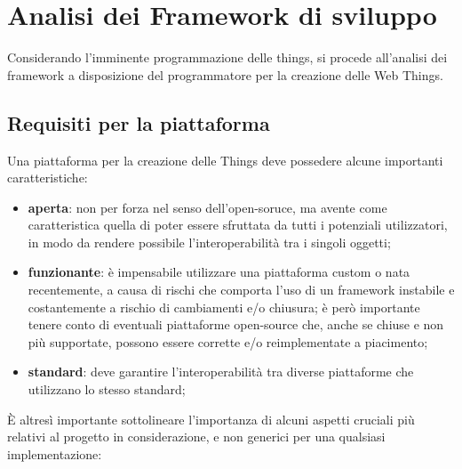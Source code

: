 \documentclass[12pt,a4paper,openright,oneside]{report}
\begin{document}
\clearpage{\pagestyle{empty}\cleardoublepage}
\chapter{Analisi dei Framework di sviluppo}           %
\lhead[\fancyplain{}{\bfseries\thepage}]{\fancyplain{}{\bfseries\rightmark}}  

Considerando l'imminente programmazione delle things, si procede all'analisi dei framework a disposizione del programmatore per la creazione delle Web Things.

\section{Requisiti per la piattaforma}
\label{sec:iot_platform}
Una piattaforma per la creazione delle Things deve possedere alcune importanti caratteristiche:

\begin{itemize}
	\setlength\itemsep{0em}
	\item \textbf{aperta}: non per forza nel senso dell'open-soruce, ma avente come caratteristica quella di poter essere sfruttata da tutti i potenziali utilizzatori, in modo da rendere possibile l'interoperabilità tra i singoli oggetti;

	\item \textbf{funzionante}: è impensabile utilizzare una piattaforma custom o nata recentemente, a causa di rischi che comporta l'uso di un framework instabile e costantemente a rischio di cambiamenti e/o chiusura; è però importante tenere conto di eventuali piattaforme open-source che, anche se chiuse e non più supportate, possono essere corrette e/o reimplementate a piacimento;
	
	\item \textbf{standard}: deve garantire l'interoperabilità tra diverse piattaforme che utilizzano lo stesso standard;
\end{itemize}

È altresì importante sottolineare l'importanza di alcuni aspetti cruciali più relativi al progetto in considerazione, e non generici per una qualsiasi implementazione:
\end{document}
